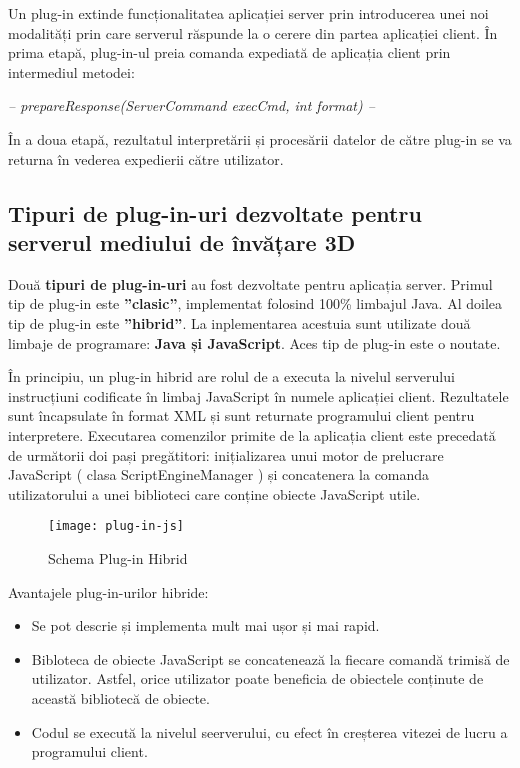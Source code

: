 Un plug-in extinde funcționalitatea aplicației server prin introducerea unei noi modalități prin care serverul răspunde la o cerere din partea aplicației client. În prima etapă, plug-in-ul preia comanda expediată de aplicația client prin intermediul metodei: \begin{center} \textit{-- prepareResponse(ServerCommand execCmd, int format) --}
\end{center} În a doua etapă, rezultatul interpretării și procesării datelor de către plug-in se va returna în vederea expedierii către utilizator.

\subsection{Tipuri de plug-in-uri dezvoltate pentru serverul mediului de învățare 3D}
\par Două \textbf{tipuri de plug-in-uri} au fost dezvoltate pentru aplicația server. Primul tip de plug-in este \textbf{”clasic”}, implementat folosind 100\% limbajul Java. Al doilea tip de plug-in este \textbf{”hibrid”}. La inplementarea acestuia sunt utilizate două limbaje de programare: \textbf{Java și JavaScript}. Aces tip de plug-in este o noutate.

\par În principiu, un plug-in hibrid are rolul de a executa la nivelul serverului instrucțiuni codificate în limbaj JavaScript în numele aplicației client. Rezultatele sunt încapsulate în format XML și sunt returnate programului client pentru interpretere. Executarea comenzilor primite de la aplicația client este precedată de următorii doi pași pregătitori: inițializarea unui motor de prelucrare JavaScript ( clasa ScriptEngineManager ) și concatenera la comanda utilizatorului a unei biblioteci care conține obiecte JavaScript utile.\\

\begin{figure}[h]
    \centering
    \texttt{[image: plug-in-js]}
    \caption{Schema Plug-in Hibrid}
    \label{fig:imag6}
\end{figure}

\pagebreak

\par Avantajele plug-in-urilor hibride:
\begin{itemize}
\item Se pot descrie și implementa mult mai ușor și mai rapid.
\item Bibloteca de obiecte JavaScript se concatenează la fiecare comandă trimisă de utilizator. Astfel, orice utilizator poate beneficia de obiectele conținute de această bibliotecă de obiecte.
\item Codul se execută la nivelul seerverului, cu efect în creșterea vitezei de lucru a programului client.
\end{itemize}

